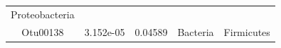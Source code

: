 \documentclass[]{article}
\begin{document}
\begin{longtable}[]{@{}ccccc@{}}
\begin{minipage}[t]{0.19\columnwidth}
Proteobacteria\strut
\end{minipage}\tabularnewline
\begin{minipage}[t]{0.13\columnwidth}\centering\strut
Otu00138\strut
\end{minipage} & \begin{minipage}[t]{0.14\columnwidth}\centering\strut
3.152e-05\strut
\end{minipage} & \begin{minipage}[t]{0.12\columnwidth}\centering\strut
0.04589\strut
\end{minipage} & \begin{minipage}[t]{0.13\columnwidth}\centering\strut
Bacteria\strut
\end{minipage} & \begin{minipage}[t]{0.19\columnwidth}\centering\strut
Firmicutes\strut
\end{minipage}\tabularnewline
\bottomrule
\end{longtable}
\end{document}
